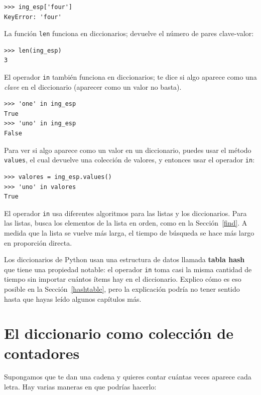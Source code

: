 \documentclass[10pt]{book}
\begin{document}
\begin{verbatim}
>>> ing_esp['four']
KeyError: 'four'
\end{verbatim}
%
La función {\tt len} funciona en diccionarios; devuelve el
número de pares clave-valor:

\begin{verbatim}
>>> len(ing_esp)
3
\end{verbatim}
%
El operador {\tt in} también funciona en diccionarios; te dice si
algo aparece como una {\em clave} en el diccionario (aparecer
como un valor no basta).

\begin{verbatim}
>>> 'one' in ing_esp
True
>>> 'uno' in ing_esp
False
\end{verbatim}
%
Para ver si algo aparece como un valor en un diccionario,
puedes usar el método {\tt values}, el cual devuelve una colección de
valores, y entonces usar el operador {\tt in}:

\begin{verbatim}
>>> valores = ing_esp.values()
>>> 'uno' in valores
True
\end{verbatim}
%
El operador {\tt in} usa diferentes algoritmos para las listas y los
diccionarios.  Para las listas, busca los elementos de la lista en
orden, como en la Sección~\ref{find}.  A medida que la lista se vuelve más larga,
el tiempo de búsqueda se hace más largo en proporción directa.

Los diccionarios de Python usan una estructura de datos
llamada {\bf tabla hash} que tiene una propiedad notable: el
operador {\tt in} toma casi la misma cantidad de tiempo sin importar
cuántos ítems hay en el diccionario.  Explico cómo es eso posible
en la Sección~\ref{hashtable}, pero la explicación podría no tener
sentido hasta que hayas leído algunos capítulos más.


\section{El diccionario como colección de contadores}
\label{histogram}

Supongamos que te dan una cadena y quieres contar cuántas
veces aparece cada letra.  Hay varias maneras en que podrías hacerlo:
\end{document}

